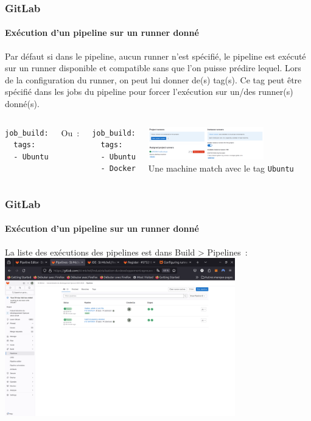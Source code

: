 \documentclass{beamer}
\begin{document}
    \begin{frame}[fragile]
        \frametitle{GitLab}
        \framesubtitle{Exécution d'un pipeline sur un runner donné}
        \transdissolve
        Par défaut si dans le pipeline, aucun runner n'est spécifié, le pipeline est exécuté sur un runner disponible et compatible sans que l'on puisse prédire lequel.
        \bigbreak
        Lors de la configuration du runner, on peut lui donner de(s) tag(s).
        \bigbreak
        Ce tag peut être spécifié dans les jobs du pipeline pour forcer l'exécution sur un/des runner(s) donné(s).
        \begin{columns}
            \begin{lstlisting}[basicstyle=\ttfamily\tiny]
job_build:
  tags:
  - Ubuntu
            \end{lstlisting}
            Ou~:
            \begin{lstlisting}[basicstyle=\ttfamily\tiny]
job_build:
  tags:
  - Ubuntu
  - Docker
            \end{lstlisting}
            \centering
            \includegraphics[width=5cm]{image/gitlab-runners.png} \\ Une machine match avec le tag \lstinline{Ubuntu} \\
        \end{columns}
    \end{frame}

    \begin{frame}
        \frametitle{GitLab}
        \framesubtitle{Exécution d'un pipeline sur un runner donné}
        \transdissolve
        La liste des exécutions des pipelines est dans Build > Pipelines~:
        \bigbreak
        \centering
        \includegraphics[width=10cm]{image/gitlab-pipelines-executions}
    \end{frame}
\end{document}

